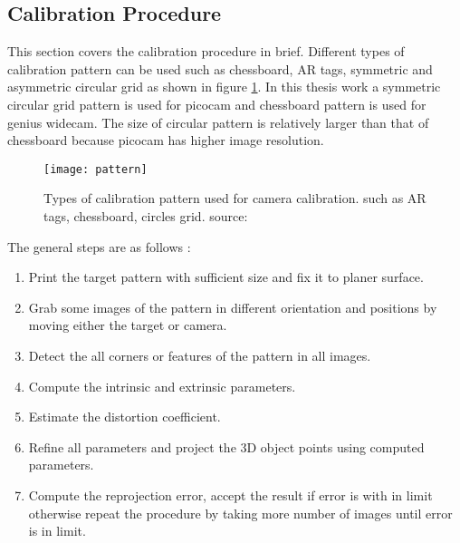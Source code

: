 \subsection{Calibration Procedure}
This section covers the calibration procedure in brief. Different types of calibration pattern can be used such as chessboard, AR tags, symmetric and asymmetric circular grid as shown in figure \ref{fig:pattern}. In this thesis work a symmetric circular grid pattern is used for picocam and chessboard pattern is used for genius widecam. The size of circular pattern is relatively larger than that of chessboard because picocam has higher image resolution.\\
\begin{figure}[h!]
	\centering
	\texttt{[image: pattern]}
	\caption{Types of calibration pattern used for camera calibration. such as AR tags, chessboard, circles grid. source:\cite{calibio}}
	\label{fig:pattern}
\end{figure}
\newline
The general steps are as follows \cite{cameracalib}:
\begin{enumerate}
	\item Print the target pattern with sufficient size and fix it to planer surface.
	\item Grab some images of the pattern in different orientation and positions by moving either the target or camera.
	\item Detect the all corners or features of the pattern in all images.
	\item Compute the intrinsic and extrinsic parameters.
	\item Estimate the distortion coefficient.
	\item Refine all parameters and project the 3D object points using computed parameters.
	\item Compute the reprojection error, accept the result if error is with in limit otherwise repeat the procedure by taking more number of images until error is in limit.
\end{enumerate}

